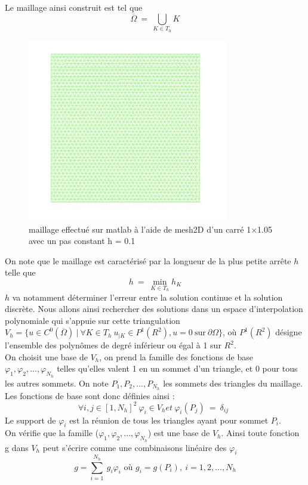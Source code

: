 \documentclass[a4paper,12pt,titlepage]{report}
\begin{document}
\begin{onehalfspace}
Le maillage ainsi construit est tel que
\[
\overline{\Omega} \ = \ \bigcup_{K \in T_{h}} K 
\]
\begin{figure}[h]
\begin{center}
\includegraphics[height = 8cm, keepaspectratio]{graphes/Maillage_initial.png} 
\caption{\label{figure 3 } maillage effectué sur matlab à l'aide de mesh2D d'un carré 1$\times$1.05 avec un pas constant h = 0.1}
\end{center}
\end{figure}

On note que le maillage est caractérisé par la longueur de la plus petite arrête $h$ telle que 
\[
h \ = \ \min_{K \in T_{h}} h_{K}
\]
$h$ va notamment déterminer l'erreur entre la solution continue et la solution discrète.
Nous allons ainsi rechercher des solutions dans un espace d'interpolation polynomiale qui s'appuie sur cette triangulation
\newline
$V_{h} = \{u \in C^0(\overline{\Omega})\ |\ \forall K \in T_h \ u_{|K} \in P^{1}(R^{2}), u = 0 \ \text{sur} \ \partial \Omega \}$, où $P^{1}(R^{2})$ désigne l'ensemble des polynômes de degré inférieur ou égal à 1 sur $R^{2}$.\\

On choisit une base de $V_{h}$, on prend la famille des fonctions de base  \\ $\varphi_{1}, \varphi_{2}, ..., \varphi_{N_{h}}$  telles qu'elles valent 1 en un sommet d’un triangle, et 0 pour tous les autres sommets. On note $P_{1},P_{2}, ..., P_{N_{h}}$ les sommets des triangles du maillage.
Les fonctions de base sont donc définies ainsi :
\[
\forall i,j \in [1, N_{h}]^{2} \ \varphi_{i} \in V_{h} et\ \varphi_{i}(P_{j}) \ = \ \delta_{ij} \ \
\]
Le support de $ \varphi_{i}$ est la réunion de tous les triangles ayant pour sommet $P_{i}$.\\
On vérifie que la famille ($\varphi_{1}, \varphi_{2}, ..., \varphi_{N_{h}}$) est une base de $V_{h}$.
Ainsi toute fonction g dans $V_{h}$ peut s'écrire comme une combinaisons linéaire des $\varphi_{i}$
\[
g = \sum_{i=1}^{N_{h}}{\ g_{i}\varphi_{i}} \text{ \ \ où } g_{i} = g(P_{i}),\  i= 1,2,...,N_{h}
\]


\end{onehalfspace}
\end{document}
